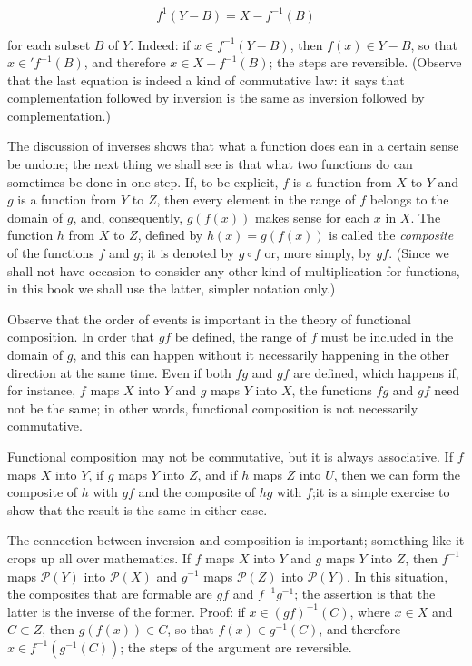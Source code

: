 \begin{equation*}
f^{1}(Y - B) = X - f^{-1}(B)
\end{equation*}

for each subset $B$ of $Y$. Indeed: if $x \in f^{-1}(Y - B)$, then $f(x) \in Y - B$, so that $x \in ' f^{-1}(B)$, and therefore $x \in X - f^{-1}(B)$; the steps are reversible. (Observe that the last equation is indeed a kind of commutative law: it says that complementation followed by inversion is the same as inversion followed by complementation.) 

The discussion of inverses shows that what a function does ean in a certain sense be undone; the next thing we shall see is that what two functions do can sometimes be done in one step. If, to be explicit, $f$ is a function from $X$ to $Y$ and $g$ is a function from $Y$ to $Z$, then every element in the range of $f$ belongs to the domain of $g$, and, consequently, $g(f(x))$ makes sense for each $x$ in $X$. The function $h$ from $X$ to $Z$, defined by $h(x) = g(f(x))$ is called the \textit{composite} of the functions $f$ and $g$; it is denoted by $g \circ f$ or, more simply, by $gf$. (Since we shall not have occasion to consider any other kind of multiplication for functions, in this book we shall use the latter, simpler notation only.) 

Observe that the order of events is important in the theory of functional composition. In order that $gf$ be defined, the range of $f$ must be included in the domain of $g$, and this can happen without it necessarily happening in the other direction at the same time. Even if both $fg$ and $gf$ are defined, which happens if, for instance, $f$ maps $X$ into $Y$ and $g$ maps $Y$ into $X$, the functions $fg$ and $gf$ need not be the same; in other words, functional composition is not necessarily commutative. 

Functional composition may not be commutative, but it is always associative. If $f$ maps $X$ into $Y$, if $g$ maps $Y$ into $Z$, and if $h$ maps $Z$ into $U$, then we can form the composite of $h$ with $gf$ and the composite of $hg$ with $f$;it is a simple exercise to show that the result is the same in either case. 

The connection between inversion and composition is important; something like it crops up all over mathematics. If $f$ maps $X$ into $Y$ and $g$ maps $Y$ into $Z$, then $f^{-1}$ maps $\mathcal{P}(Y)$ into $\mathcal{P}(X)$ and $g^{-1}$ maps $\mathcal{P}(Z)$ into $\mathcal{P}(Y)$. In this situation, the composites that are formable are $gf$ and $f^{-1}g^{-1}$; the assertion is that the latter is the inverse of the former. Proof: if $x \in (gf)^{-1}(C)$, where $x \in X$ and $C \subset Z$, then $g(f(x)) \in C$, so that $f(x) \in g^{-1}(C)$, and therefore $x \in f^{-1}(g^{-1}(C))$; the steps of the argument are reversible. 

